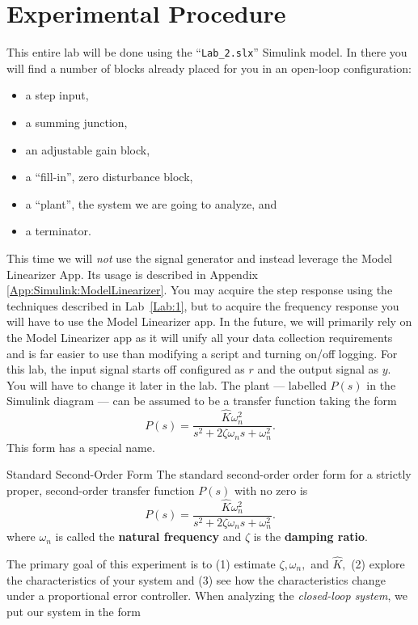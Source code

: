\section{Experimental Procedure}
This entire lab will be done using the ``\texttt{Lab\_2.slx}'' Simulink model.
In there you will
find a number of blocks already placed for you in an 
open-loop configuration:
\begin{itemize}
  \item{a step input,}
  \item{a summing junction,}
  \item{an adjustable gain block,}
  \item{a ``fill-in'', zero disturbance block,}
  \item{a ``plant'', the system we are going to analyze, and}
  \item{a terminator.}
\end{itemize}
This time we will \emph{not} use the signal generator and instead leverage
the Model Linearizer App. Its usage is described in Appendix
\ref{App:Simulink:ModelLinearizer}. You may acquire the step response
using the techniques described in Lab~\ref{Lab:1}, but to acquire the frequency
response you will have to use the Model Linearizer app. In the future, we will
primarily rely on the Model Linearizer app as it will
unify all your data collection
requirements and is far easier to use than modifying a script and turning
on/off logging. For this lab, the input signal starts off configured
as \(r\) and the output signal as \(y.\) You will have to change it later
in the lab.
%
The plant --- labelled \(P(s)\) in the Simulink diagram --- can be assumed
to be a transfer function taking the form
\[
  P(s) = \frac{\hat{K}\omega_n^2}{s^2 + 2\zeta\omega_n s + \omega_n^2}.
\]
This form has a special name.
%
\begin{definition}[]{Standard Second-Order Form}
  The standard second-order order form for a strictly proper, second-order
  transfer function \(P(s)\) with no zero is
  \[
    P(s) = \frac{\hat{K} \omega_n^2}{s^2 + 2 \zeta \omega_n s + \omega_n^2}.
  \]
  where \(\omega_n\) is called the \textbf{natural frequency} and
  \(\zeta\) is the \textbf{damping ratio}.
\end{definition}
%
The primary goal of this experiment is to (1) estimate \(\zeta,\)\(\omega_n,\)
and \(\hat{K},\) (2) explore the characteristics of your system and
(3) see how the characteristics change under a proportional error controller.
When analyzing the \emph{closed-loop system}, we put our system in the form
